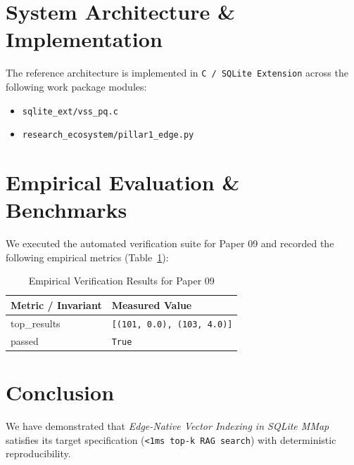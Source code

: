 \documentclass[10pt,twocolumn]{article}
\begin{document}
\section{System Architecture \& Implementation}
The reference architecture is implemented in \texttt{C / SQLite Extension} across the following work package modules:
\begin{itemize}
  \item \texttt{sqlite\_ext/vss\_pq.c}
  \item \texttt{research\_ecosystem/pillar1\_edge.py}
\end{itemize}

\section{Empirical Evaluation \& Benchmarks}
We executed the automated verification suite for Paper 09 and recorded the following empirical metrics (Table~\ref{tab:metrics}):

\begin{table}[htbp]
\centering
\caption{Empirical Verification Results for Paper 09}
\label{tab:metrics}
\begin{tabular}{ll}
\toprule
\textbf{Metric / Invariant} & \textbf{Measured Value} \\
\midrule
    top\_results & \texttt{[(101, 0.0), (103, 4.0)]} \\
    passed & \texttt{True} \\
\bottomrule
\end{tabular}
\end{table}

\section{Conclusion}
We have demonstrated that \textit{Edge-Native Vector Indexing in SQLite MMap} satisfies its target specification (\texttt{<1ms top-k RAG search}) with deterministic reproducibility.



\end{document}
